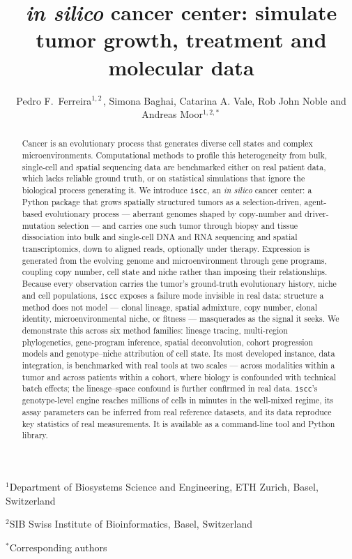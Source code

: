 \documentclass{article}
\title{\textit{in silico} cancer center: simulate tumor growth, treatment and molecular data}
\author{
  Pedro F.~Ferreira$^{1,2\,}$,\; Simona Baghai, Catarina A. Vale, Rob John Noble and Andreas Moor$^{1,2,*\,}$
}
\date{}
\date{\vspace{-5ex}}
\newenvironment{affiliations}{\begin{flushleft}\small}{\end{flushleft}}%
\begin{document}
\maketitle

\begin{affiliations}
 \item $^1$Department of Biosystems Science and Engineering, ETH Zurich, Basel, Switzerland
 \item $^2$SIB Swiss Institute of Bioinformatics, Basel, Switzerland
  \item $^*$Corresponding authors
\end{affiliations}

\vspace{.5cm}

\begin{abstract}
Cancer is an evolutionary process that generates diverse cell states and complex
microenvironments. Computational methods to profile this heterogeneity from bulk, single-cell and
spatial sequencing data are benchmarked either on real patient data, which lacks reliable ground
truth, or on statistical simulations that ignore the biological process generating it. We introduce \texttt{iscc}, an \textit{in silico} cancer center: a
Python package that grows spatially structured tumors as a selection-driven, agent-based
evolutionary process --- aberrant genomes shaped by copy-number and driver-mutation selection ---
and carries one such tumor through biopsy and tissue dissociation into bulk and single-cell DNA and
RNA sequencing and spatial transcriptomics, down to aligned reads, optionally under therapy.
Expression is generated from the evolving genome and microenvironment through gene programs, coupling
copy number, cell state and niche rather than imposing their relationships. Because every observation carries the tumor's ground-truth
evolutionary history, niche and cell populations, \texttt{iscc} exposes a failure mode invisible
in real data: structure a method does not model ---
clonal lineage, spatial admixture, copy number, clonal identity, microenvironmental niche, or fitness --- masquerades as the
signal it seeks. We demonstrate this across six method families: lineage tracing, multi-region
phylogenetics, gene-program inference, spatial deconvolution, cohort progression models and
genotype--niche attribution of cell state.
Its most developed instance, data integration, is benchmarked with real tools at two scales --- across
modalities within a tumor and across patients within a cohort, where biology is confounded with
technical batch effects; the lineage--space confound is further confirmed in real data. \texttt{iscc}'s genotype-level engine reaches millions of cells in
minutes in the well-mixed regime, its assay parameters can be inferred from real reference datasets,
and its data reproduce key statistics of real measurements. It is available as a
command-line tool and Python library.
\end{abstract}
\end{document}

